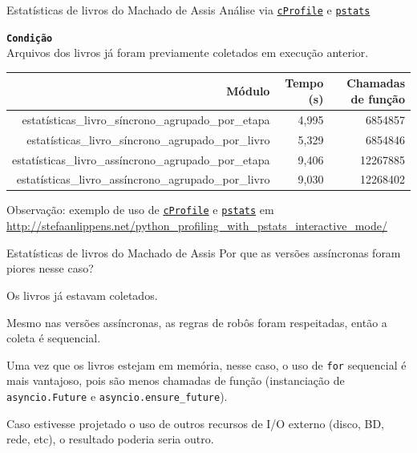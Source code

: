 \documentclass[12pt]{beamer}
\begin{document}
\begin{frame}[fragile]{Estatísticas de livros do Machado de Assis}
  Análise via \texttt{\href{https://docs.python.org/3/library/profile.html}{cProfile}} e \texttt{\href{https://docs.python.org/3/library/profile.html}{pstats}}

  \footnotesize{\textbf{\texttt{Condição}} \\
  \scriptsize{Arquivos dos livros já foram previamente coletados em execução anterior.}}

  \scriptsize{
  \begin{table}
    \vspace{-0.5cm}
    \begin{tabular}{@{} rrr @{}}
      \toprule
      Módulo & Tempo (s) & Chamadas de função \\
      \midrule
      estatísticas\_livro\_síncrono\_agrupado\_por\_etapa   & 4,995 &  6854857 \\
      estatísticas\_livro\_síncrono\_agrupado\_por\_livro   & 5,329 &  6854846 \\
      estatísticas\_livro\_assíncrono\_agrupado\_por\_etapa & 9,406 & 12267885 \\
      estatísticas\_livro\_assíncrono\_agrupado\_por\_livro & 9,030 & 12268402 \\
      \bottomrule
    \end{tabular}
  \end{table}}

  Observação: exemplo de uso de \texttt{\href{https://docs.python.org/3/library/profile.html}{cProfile}} e \texttt{\href{https://docs.python.org/3/library/profile.html}{pstats}} em \\
  \tiny{\url{http://stefaanlippens.net/python\_profiling\_with\_pstats\_interactive\_mode/}}
\end{frame}

\begin{frame}[fragile]{Estatísticas de livros do Machado de Assis}
  Por que as versões assíncronas foram piores nesse caso?

  \begin{itemize}\small{
    \item Os livros já estavam coletados.
    \item Mesmo nas versões assíncronas, as regras de robôs foram respeitadas, então a coleta é sequencial.
    \item Uma vez que os livros estejam em memória, nesse caso, o uso de \texttt{for} sequencial é mais vantajoso, pois são menos chamadas de função (instanciação de \texttt{asyncio.Future} e \texttt{asyncio.ensure\_future}).
    \item Caso estivesse projetado o uso de outros recursos de I/O externo (disco, BD, rede, etc), o resultado poderia seria outro.
  }\end{itemize}
\end{frame}
\end{document}
